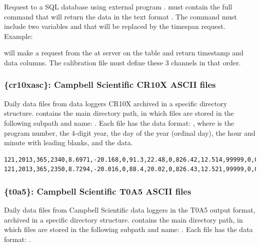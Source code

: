 Request to a SQL database using external program .  must contain the full command that will return the data in the text format . The command must include two variables  and  that will be replaced by the timespan request. Example:


will make a request from the  at server  on the table  and return timestamp and data columns. The calibration file must define these 3 channels in that order.

\subsubsection{\{cr10xasc\}: Campbell Scientific CR10X ASCII files}

Daily data files from data loggers CR10X archived in a specific directory structure.  contains the main directory path, in which files are stored in the following subpath and name: . Each file has the data format: , where  is the program number,  the 4-digit year,  the day of the year (ordinal day),  the hour and minute with leading blanks, and the data.

\begin{lstlisting}[language={},title=Campbell CR10X format example]
121,2013,365,2340,8.6971,-20.168,0,91.3,22.48,0,826.42,12.514,99999,0,0
121,2013,365,2350,8.7294,-20.016,0,88.4,20.02,0,826.43,12.521,99999,0,0
\end{lstlisting}


\subsubsection{\{t0a5\}: Campbell Scientific T0A5 ASCII files}

Daily data files from Campbell Scientific data loggers in the T0A5 output format, archived in a specific directory structure.  contains the main directory path, in which files are stored in the following subpath and name: . Each file has the data format: .

